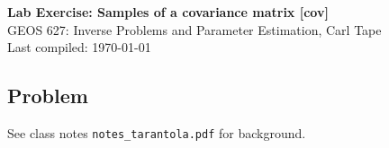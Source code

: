 \documentclass[11pt,titlepage,fleqn]{article}
\begin{document}

\begin{spacing}{1.2}
\begin{center}
{\large \bf Lab Exercise: Samples of a covariance matrix [cov]} \\
GEOS 627: Inverse Problems and Parameter Estimation, Carl Tape \\
Last compiled: \today
\end{center}
\end{spacing}


\subsection*{Problem}

See class notes \verb+notes_tarantola.pdf+ for background.
\end{document}
